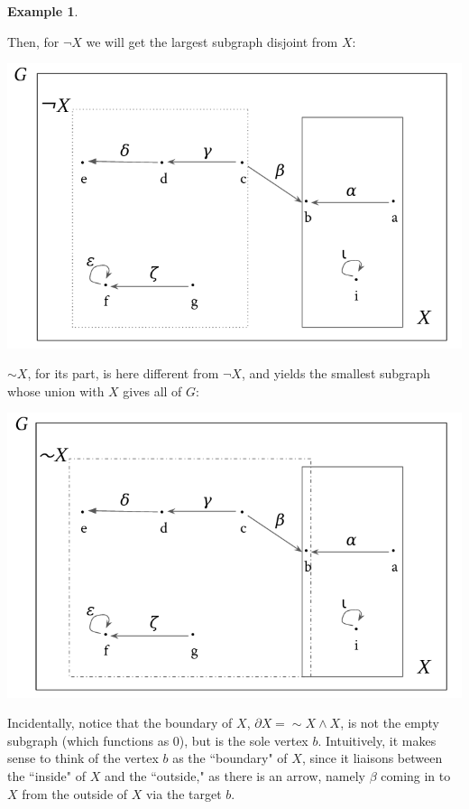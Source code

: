 \documentclass[a4paper]{book}
\theoremstyle{definition}
\newtheorem{example}{Example}[section]
\theoremstyle{definition}
\theoremstyle{definition}
\theoremstyle{theorem}
\theoremstyle{definition}
\begin{document}
\begin{example}
\begin{center}
	\end{center}
	Then, for $\neg X$ we will get the largest subgraph disjoint from $X$:
	\begin{center}
		\includegraphics*[scale=0.25]{GraphSubgraphNegation2.png}
	\end{center}
	$\sim X$, for its part, is here different from $\neg X$, and yields the smallest subgraph whose union with $X$ gives all of $G$: 
	\begin{center}
		\includegraphics*[scale=0.25]{GraphSubgraphNegation3.png}
	\end{center}
	Incidentally, notice that the boundary of $X$, $\partial X = \sim X \wedge X$, is not the empty subgraph (which functions as $0$), but is the sole vertex $b$. Intuitively, it makes sense to think of the vertex $b$ as the ``boundary" of $X$, since it liaisons between the ``inside" of $X$ and the ``outside," as there is an arrow, namely $\beta$ coming in to $X$ from the outside of $X$ via the target $b$. 

\end{example}
\end{document}
